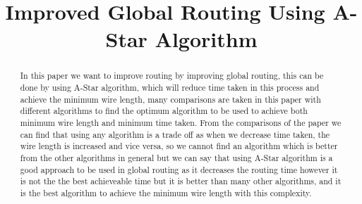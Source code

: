 \documentclass[conference]{IEEEtran}
\begin{document}

\title{Improved Global Routing Using A-Star Algorithm\\}


\author{
}


\maketitle


\begin{abstract}
    In this paper we want to improve routing by improving global routing, this can be done by using A-Star algorithm, which will reduce time taken in this process and achieve the minimum wire length, many comparisons are taken in this paper with different algorithms to find the optimum algorithm to be used to achieve both minimum wire length and minimum time taken. From the comparisons of the paper we can find that using any algorithm is a trade off as when we decrease time taken, the wire length is increased and vice versa, so we cannot find an algorithm which is better from the other algorithms in general but we can say that using A-Star algorithm is a good approach to be used in global routing as it decreases the routing time however it is not the the best achieveable time but it is better than many other algorithms, and it is the best algorithm to achieve the minimum wire length with this complexity.
\end{abstract}
\end{document}
